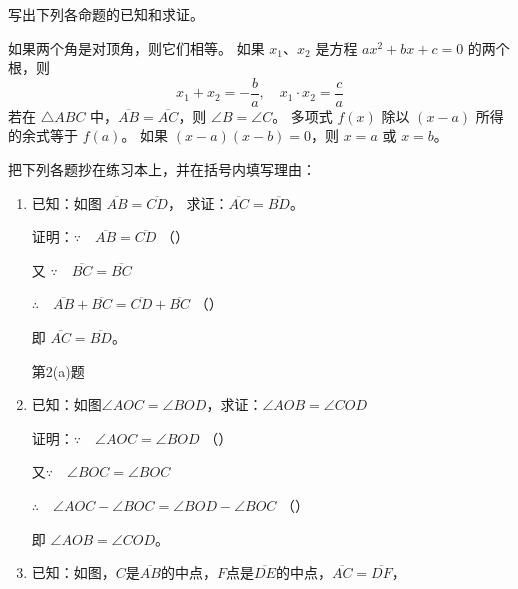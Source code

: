 \begin{Exercise}
\begin{question}
	\item 写出下列各命题的已知和求证。
	\begin{tasks}
		\task 如果两个角是对顶角，则它们相等。
		\task 如果 $x_1$、$x_2$ 是方程 $ax^2+bx+c=0$ 的两个根，则
		\[x_1+x_2=-\frac{b}{a},\quad x_1\cdot x_2=\frac{c}{a}\]
		\task 若在 $\triangle ABC$ 中，$\overline{AB}=\overline{AC}$，则 $\angle B=\angle C$。
		\task 多项式 $f(x)$ 除以 $(x-a)$ 所得的余式等于 $f(a)$。
		\task 如果 $(x-a)(x-b)=0$，则 $x=a$ 或 $x=b$。
	\end{tasks}
	\item 把下列各题抄在练习本上，并在括号内填写理由：
\begin{enumerate}
	\item 已知：如图 $\overline{AB}=\overline{CD}$，	求证：$\overline{AC}=\overline{BD}$。

	证明：$\because\quad \overline{AB}=\overline{CD}$ （\qquad）

	又 $\because\quad \overline{BC}=\overline{BC}$

	$\therefore\quad \overline{AB}+\overline{BC}=\overline{CD}+\overline{BC}$ （\qquad）

	即 $\overline{AC}=\overline{BD}$。

\begin{figurehere}
	\caption*{第2(a)题}
\end{figurehere}

\item 已知：如图$\angle AOC=\angle BOD$，求证：$\angle AOB=\angle COD$

证明：$\because\quad \angle AOC=\angle BOD$ （\qquad）
	
又$\because\quad \angle BOC=\angle BOC$

$\therefore\quad \angle AOC-\angle BOC=\angle BOD-\angle BOC$ （\qquad ）

即 $\angle AOB=\angle COD$。

\item 已知：如图，$C$是$\overline{AB}$的中点，$F$点是$\overline{DE}$的中点，$\overline{AC}=\overline{DF}$，


\end{enumerate}
\end{question}
\end{Exercise}
